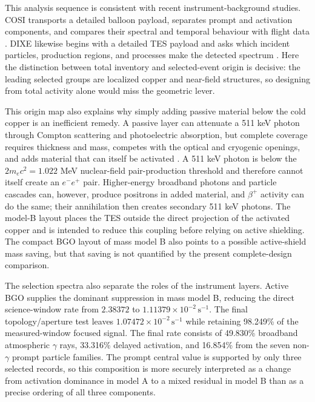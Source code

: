 \documentclass[11pt]{article}
\newcommand{\revblue}[1]{\textcolor{revisionblue}{#1}}
\newcommand{\cps}{\ensuremath{\,\mathrm{s^{-1}}}}
\begin{document}
This analysis sequence is consistent with recent instrument-background studies.
COSI transports a detailed balloon payload, separates prompt and activation
components, and compares their spectral and temporal behaviour with flight data
\cite{Gallego2025Balloon}. DIXE likewise begins with a detailed TES payload and
asks which incident particles, production regions, and processes make the
detected spectrum \cite{Tian2026DIXE}. Here the distinction between total
inventory and selected-event origin is decisive: the leading selected groups are
localized copper and near-field structures, so designing from total activity
alone would miss the geometric lever.

This origin map also explains why simply adding passive material below the cold
copper is an inefficient remedy. A passive layer can attenuate a 511 keV photon
through Compton scattering and photoelectric absorption, but complete coverage
requires thickness and mass, competes with the optical and cryogenic openings,
and adds material that can itself be activated \cite{NISTXCOM}. A 511 keV
photon is below the $2m_ec^2=1.022$ MeV nuclear-field pair-production
threshold and therefore cannot itself create an $e^-e^+$ pair. Higher-energy
broadband photons and particle cascades can, however, produce positrons in added
material, and $\beta^+$ activity can do the same; their annihilation then
creates secondary 511 keV photons. The model-B layout places the TES outside the
direct projection of the activated copper and is intended to reduce this coupling
before relying on active shielding. The compact BGO layout of mass model B also points
to a possible active-shield mass saving, but that saving is not quantified by
the present complete-design comparison.

The selection spectra also separate the roles of the instrument layers. Active
BGO supplies the dominant suppression in mass model B, reducing the direct
science-window rate from $2.38372$ to $1.11379\times10^{-2}\cps$. The final
topology/aperture test leaves $1.07472\times10^{-2}\cps$ while retaining
98.249\% of the measured-window focused signal. The final rate consists of
49.830\% broadband atmospheric $\gamma$ rays, 33.316\% delayed activation, and 16.854\%
from the \revblue{seven non-$\gamma$ prompt particle families}. The prompt central value is supported
by only three selected records, so this composition is more securely interpreted
as a change from activation dominance in model A to a mixed residual in model B
than as a precise ordering of all three components.
\end{document}
